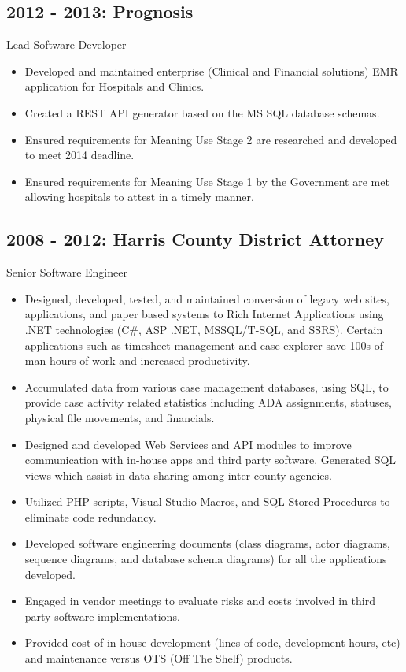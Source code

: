 \documentclass[11pt]{article}
\begin{document}
        \subsection*{2012 - 2013: Prognosis}
            Lead Software Developer
            \begin{itemize}
                \item Developed and maintained enterprise (Clinical and Financial solutions) EMR application for Hospitals and Clinics.
                \item Created a REST API generator based on the MS SQL database schemas.
                \item Ensured requirements for Meaning Use Stage 2 are researched and developed to meet 2014 deadline.
                \item Ensured requirements for Meaning Use Stage 1 by the Government are met allowing hospitals to attest in a timely manner.
            \end{itemize}

        \subsection*{2008 - 2012: Harris County District Attorney}
            Senior Software Engineer
            \begin{itemize}
                \item Designed, developed, tested, and maintained conversion of legacy web sites, applications, and paper based systems to Rich Internet Applications using .NET technologies (C\#, ASP .NET, MSSQL/T-SQL, and SSRS). Certain applications such as timesheet management and case explorer save 100s of man hours of work and increased productivity.
                \item Accumulated data from various case management databases, using SQL, to provide case activity related statistics including ADA assignments, statuses, physical file movements, and financials.
                \item Designed and developed Web Services and API modules to improve communication with in-house apps and third party software. Generated SQL views which assist in data sharing among inter-county agencies.
                \item Utilized PHP scripts, Visual Studio Macros, and SQL Stored Procedures to eliminate code redundancy.
                \item Developed software engineering documents (class diagrams, actor diagrams, sequence diagrams, and database schema diagrams) for all the applications developed.
                \item Engaged in vendor meetings to evaluate risks and costs involved in third party software implementations.
                \item Provided cost of in-house development (lines of code, development hours, etc) and maintenance versus OTS (Off The Shelf) products.
            \end{itemize}
\end{document}
